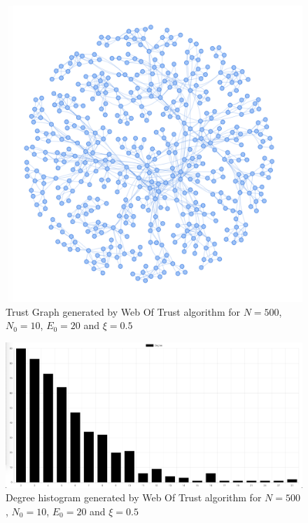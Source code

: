 \begin{figure}[h!]
    \includegraphics[width=\textwidth]{img/webOfTrust500Graph.png}
    \centering
    \caption{Trust Graph generated by Web Of Trust algorithm for $N=500$, $N_0=10$, $E_0=20$ and $\xi = 0.5$}
    \label{fig:trustgraph500}
\end{figure}

\begin{figure}[h!]
    \includegraphics[width=\textwidth]{img/webOfTrust500Hist.png}
    \centering
    \caption{Degree histogram generated by Web Of Trust algorithm for $N=500$, $N_0=10$, $E_0=20$ and $\xi = 0.5$}
    \label{fig:trustgraph500histogram}
\end{figure} 

